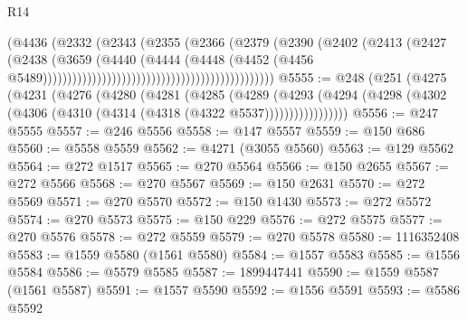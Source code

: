 \begin{lexlean}{R14}
\begin{coremodule}
                                                                (@4436
                                                                  (@2332
                                                                    (@2343
                                                                      (@2355
                                                                        (@2366
                                                                          (@2379
                                                                            (@2390
                                                                              (@2402
                                                                                (@2413
                                                                                  (@2427
                                                                                    (@2438
                                                                                      (@3659
                                                                                        (@4440
                                                                                          (@4444
                                                                                            (@4448
                                                                                              (@4452
                                                                                                (@4456
                                                                                                  @5489)))))))))))))))))))))))))))))))))))))))))))))))
@5555 := @248
    (@251
      (@4275
        (@4231
          (@4276
            (@4280
              (@4281
                (@4285
                  (@4289
                    (@4293
                      (@4294 (@4298 (@4302 (@4306 (@4310 (@4314 (@4318 (@4322 @5537)))))))))))))))))
@5556 := @247 @5555
@5557 := @246 @5556
@5558 := @147 @5557
@5559 := @150 @686
@5560 := @5558 @5559
@5562 := @4271 (@3055 @5560)
@5563 := @129 @5562
@5564 := @272 @1517
@5565 := @270 @5564
@5566 := @150 @2655
@5567 := @272 @5566
@5568 := @270 @5567
@5569 := @150 @2631
@5570 := @272 @5569
@5571 := @270 @5570
@5572 := @150 @1430
@5573 := @272 @5572
@5574 := @270 @5573
@5575 := @150 @229
@5576 := @272 @5575
@5577 := @270 @5576
@5578 := @272 @5559
@5579 := @270 @5578
@5580 := 1116352408
@5583 := @1559 @5580 (@1561 @5580)
@5584 := @1557 @5583
@5585 := @1556 @5584
@5586 := @5579 @5585
@5587 := 1899447441
@5590 := @1559 @5587 (@1561 @5587)
@5591 := @1557 @5590
@5592 := @1556 @5591
@5593 := @5586 @5592

\end{coremodule}
\end{lexlean}
